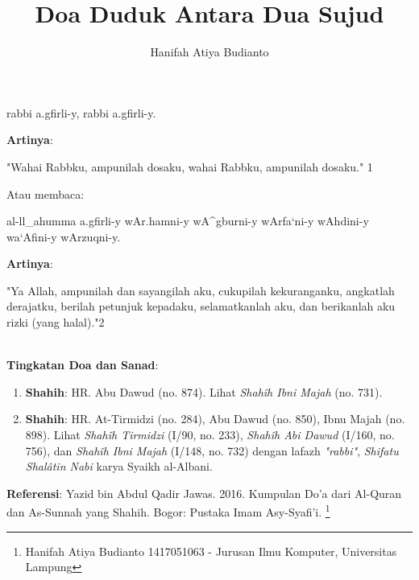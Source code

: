 \documentclass[a4paper,12pt]{article}
\title{\Large Doa Duduk Antara Dua Sujud}
\author{\calligra Hanifah Atiya Budianto}
\begin{document}
\sffamily
\maketitle 
\fullvocalize
{}
\begin{arabtext}
\noindent
rabbi a.gfirli-y, rabbi a.gfirli-y.\\
\end{arabtext}
\noindent
\textbf{Artinya}:
\par
\indent
"Wahai Rabbku, ampunilah dosaku, wahai Rabbku, ampunilah dosaku."
{\scriptsize 1}\\
\par
\indent
Atau membaca:
\begin{arabtext}
\noindent
al-ll_ahumma a.gfirli-y wAr.hamni-y wA^gburni-y wArfa`ni-y wAhdini-y 
wa`Afini-y wArzuqni-y.\\
\end{arabtext}
\noindent
\textbf{Artinya}:
\par
\indent
"Ya Allah, ampunilah dan sayangilah aku, cukupilah kekuranganku, angkatlah 
derajatku, berilah petunjuk kepadaku, selamatkanlah aku, dan berikanlah aku
rizki (yang halal)."{\scriptsize 2}\\\\
\par
\noindent
\textbf{Tingkatan Doa dan Sanad}: 
\begin{enumerate}
\item \textbf{Shahih}: HR. Abu Dawud (no. 874). Lihat \textit{Shah\^{i}h 
Ibni Majah} (no. 731).
\item \textbf{Shahih}: HR. At-Tirmidzi (no. 284), Abu Dawud (no. 850), Ibnu
Majah (no. 898). Lihat \textit{Shah\^{i}h Tirmidzi} (I/90, no. 233), 
\textit{Shah\^{i}h Abi Dawud} (I/160, no. 756), dan \textit{Shah\^{i}h Ibni 
Majah} (I/148, no. 732) dengan lafazh \textit{"rabbi"}, \textit{Shifatu 
Shal\^{a}tin Nabi} karya Syaikh al-Albani.
\end{enumerate}
\textbf{Referensi}: Yazid bin Abdul Qadir Jawas. 2016. Kumpulan Do'a dari
Al-Quran dan As-Sunnah yang Shahih. Bogor: Pustaka Imam Asy-Syafi'i.
\footnote{Hanifah Atiya Budianto 1417051063 - Jurusan Ilmu Komputer,
Universitas Lampung}
\end{document}
